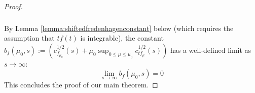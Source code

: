 \documentclass[a4paper,11pt]{article}
\theoremstyle{definition}
\newcommand{\lb}{\left(}
\newcommand{\rb}{\right)}
\begin{document}
\begin{proof}
\begin{align}
\begin{split}
        \end{split}
    \end{align}
    By Lemma \ref{lemma:shiftedfredenhagenconstant} below (which requires the assumption that $tf(t)$ is integrable), the constant $b_f(\mu_0, s) := \lb c^{1/2}_{f_{\mu_0}}(s) + \mu_0\sup_{0\leq \mu\leq \mu_0}c^{1/2}_{tf_\mu}(s)\rb$ has a well-defined limit as $s\rightarrow\infty$:
    \begin{equation}
        \lim_{s\rightarrow\infty}b_f(\mu_0, s) = 0
    \end{equation}
    This concludes the proof of our main theorem. 
\end{proof}







\end{document}
